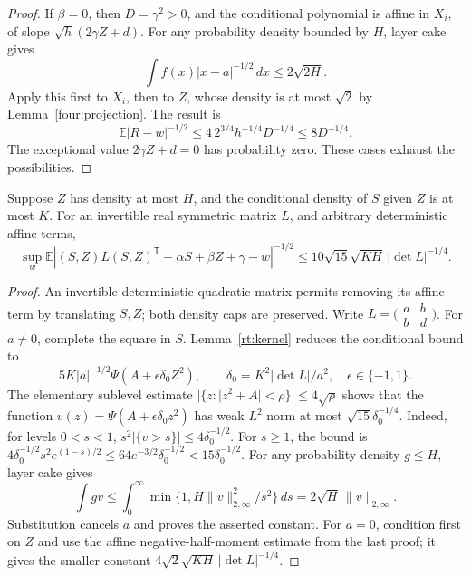 \begin{proof}
If \(\beta=0\), then \(D=\gamma^2>0\), and the
conditional polynomial is affine in \(X_i\), of slope
\(\sqrt h(2\gamma Z+d)\).
For any probability density bounded by \(H\),
layer cake gives
\[
 \int f(x)|x-a|^{-1/2}\,dx\leq2\sqrt{2H}.
\]
Apply this first to \(X_i\), then to \(Z\), whose
density is at most \(\sqrt2\) by
Lemma~\ref{four:projection}.  The result is
\[
 \mathbb E|R-w|^{-1/2}
 \leq4\,2^{3/4}h^{-1/4}D^{-1/4}
 \leq8D^{-1/4}.
\]
The exceptional value \(2\gamma Z+d=0\) has probability
zero.  These cases exhaust the possibilities.
\end{proof}

\begin{lemma}
\label{rt:conditional}
Suppose \(Z\) has density at most \(H\), and the
conditional density of \(S\) given \(Z\) is at most
\(K\).  For an invertible real symmetric matrix \(L\),
and arbitrary deterministic affine terms,
\[
 \sup_w\mathbb E\left|
 (S,Z)L(S,Z)^{\mathsf T}+\alpha S+\beta Z+\gamma-w
 \right|^{-1/2}
 \leq10\sqrt{15}\sqrt{KH}\,|\det L|^{-1/4}.
\]
\end{lemma}
\begin{proof}
An invertible deterministic quadratic matrix permits
removing its affine term by translating \(S,Z\);
both density caps are preserved.
Write
\(L=\bigl(\begin{smallmatrix}a&b\\b&d\end{smallmatrix}\bigr)\).
For \(a\ne0\), complete the square in \(S\).
Lemma~\ref{rt:kernel} reduces the conditional bound to
\[
 5K|a|^{-1/2}\Psi(A+\epsilon\delta_0Z^2),
 \qquad
 \delta_0=K^2|\det L|/a^2,\quad \epsilon\in\{-1,1\}.
\]
The elementary sublevel estimate
\(|\{z:|z^2+A|<\rho\}|\leq4\sqrt\rho\)
shows that the function
\(v(z)=\Psi(A+\epsilon\delta_0z^2)\) has weak \(L^2\)
norm at most \(\sqrt{15}\delta_0^{-1/4}\).
Indeed, for levels \(0<s<1\),
\(s^2|\{v>s\}|\leq4\delta_0^{-1/2}\).
For \(s\geq1\), the bound is
\(4\delta_0^{-1/2}s^2e^{(1-s)/2}
\leq64e^{-3/2}\delta_0^{-1/2}
<15\delta_0^{-1/2}\).
For any probability density \(g\leq H\), layer cake
gives
\[
 \int gv\leq
 \int_0^\infty\min\{1,H\|v\|_{2,\infty}^2/s^2\}\,ds
 =2\sqrt H\,\|v\|_{2,\infty}.
\]
Substitution cancels \(a\) and proves the asserted
constant.  For \(a=0\), condition first on \(Z\) and
use the affine negative-half-moment estimate from the
last proof; it gives the smaller constant
\(4\sqrt2\sqrt{KH}\,|\det L|^{-1/4}\).
\end{proof}

